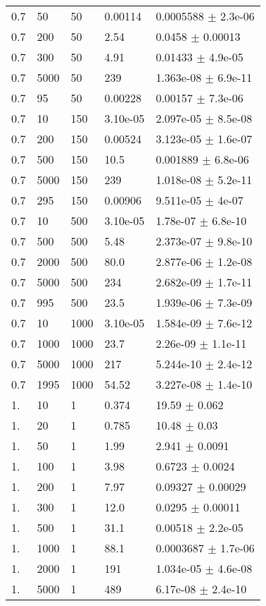 \begin{longtable}{lllll}
	0.7 & 50 & 50 & 0.00114 & 0.0005588 $\pm$ 2.3e-06 \\
	0.7 & 200 & 50 & 2.54 & 0.0458 $\pm$ 0.00013 \\
	0.7 & 300 & 50 & 4.91 & 0.01433 $\pm$ 4.9e-05 \\
	0.7 & 5000 & 50 & 239 & 1.363e-08 $\pm$ 6.9e-11 \\
	0.7 & 95 & 50 & 0.00228 & 0.00157 $\pm$ 7.3e-06 \\
	0.7 & 10 & 150 & 3.10e-05 & 2.097e-05 $\pm$ 8.5e-08 \\
	0.7 & 200 & 150 & 0.00524 & 3.123e-05 $\pm$ 1.6e-07 \\
	0.7 & 500 & 150 & 10.5 & 0.001889 $\pm$ 6.8e-06 \\
	0.7 & 5000 & 150 & 239 & 1.018e-08 $\pm$ 5.2e-11 \\
	0.7 & 295 & 150 & 0.00906 & 9.511e-05 $\pm$ 4e-07 \\
	0.7 & 10 & 500 & 3.10e-05 & 1.78e-07 $\pm$ 6.8e-10 \\
	0.7 & 500 & 500 & 5.48 & 2.373e-07 $\pm$ 9.8e-10 \\
	0.7 & 2000 & 500 & 80.0 & 2.877e-06 $\pm$ 1.2e-08 \\
	0.7 & 5000 & 500 & 234 & 2.682e-09 $\pm$ 1.7e-11 \\
	0.7 & 995 & 500 & 23.5 & 1.939e-06 $\pm$ 7.3e-09 \\
	0.7 & 10 & 1000 & 3.10e-05 & 1.584e-09 $\pm$ 7.6e-12 \\
	0.7 & 1000 & 1000 & 23.7 & 2.26e-09 $\pm$ 1.1e-11 \\
	0.7 & 5000 & 1000 & 217 & 5.244e-10 $\pm$ 2.4e-12 \\
	0.7 & 1995 & 1000 & 54.52 & 3.227e-08 $\pm$ 1.4e-10 \\
	1. & 10 & 1 & 0.374 & 19.59 $\pm$ 0.062 \\
	1. & 20 & 1 & 0.785 & 10.48 $\pm$ 0.03 \\
	1. & 50 & 1 & 1.99 & 2.941 $\pm$ 0.0091 \\
	1. & 100 & 1 & 3.98 & 0.6723 $\pm$ 0.0024 \\
	1. & 200 & 1 & 7.97 & 0.09327 $\pm$ 0.00029 \\
	1. & 300 & 1 & 12.0 & 0.0295 $\pm$ 0.00011 \\
	1. & 500 & 1 & 31.1 & 0.00518 $\pm$ 2.2e-05 \\
	1. & 1000 & 1 & 88.1 & 0.0003687 $\pm$ 1.7e-06 \\
	1. & 2000 & 1 & 191 & 1.034e-05 $\pm$ 4.6e-08 \\
	1. & 5000 & 1 & 489 & 6.17e-08 $\pm$ 2.4e-10 \\

\end{longtable}
